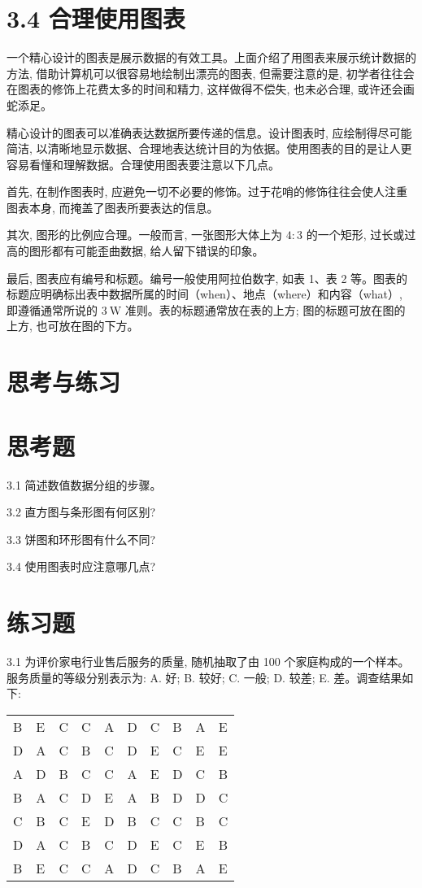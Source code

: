 \documentclass[10pt]{article}
\begin{document}
\begin{CJK*}{UTF8}{bsmi}
\section*{3.4 合理使用图表}
一个精心设计的图表是展示数据的有效工具。上面介绍了用图表来展示统计数据的方法, 借助计算机可以很容易地绘制出漂亮的图表, 但需要注意的是, 初学者往往会在图表的修饰上花费太多的时间和精力, 这样做得不偿失, 也未必合理, 或许还会画蛇添足。

精心设计的图表可以准确表达数据所要传递的信息。设计图表时, 应绘制得尽可能简洁, 以清晰地显示数据、合理地表达统计目的为依据。使用图表的目的是让人更容易看懂和理解数据。合理使用图表要注意以下几点。

首先, 在制作图表时, 应避免一切不必要的修饰。过于花哨的修饰往往会使人注重图表本身, 而掩盖了图表所要表达的信息。

其次, 图形的比例应合理。一般而言, 一张图形大体上为 $4: 3$ 的一个矩形, 过长或过高的图形都有可能歪曲数据, 给人留下错误的印象。

最后, 图表应有编号和标题。编号一般使用阿拉伯数字, 如表 1、表 2 等。图表的标题应明确标出表中数据所属的时间（when）、地点（where）和内容（what）, 即遵循通常所说的 $3 \mathrm{~W}$ 准则。表的标题通常放在表的上方; 图的标题可放在图的上方, 也可放在图的下方。

\section*{思考与练习}
\section*{思考题}
3.1 简述数值数据分组的步骤。

3.2 直方图与条形图有何区别?

3.3 饼图和环形图有什么不同?

3.4 使用图表时应注意哪几点?

\section*{练习题}
3.1 为评价家电行业售后服务的质量, 随机抽取了由 100 个家庭构成的一个样本。服务质量的等级分别表示为: A. 好; B. 较好; C. 一般; D. 较差; E. 差。调查结果如下:

\begin{center}
\begin{tabular}{llllllllll}
\hline
B & E & C & C & A & D & C & B & A & E \\
D & A & C & B & C & D & E & C & E & E \\
A & D & B & C & C & A & E & D & C & B \\
B & A & C & D & E & A & B & D & D & C \\
C & B & C & E & D & B & C & C & B & C \\
D & A & C & B & C & D & E & C & E & B \\
B & E & C & C & A & D & C & B & A & E \\
\hline
\end{tabular}
\end{center}


\end{CJK*}
\end{document}
